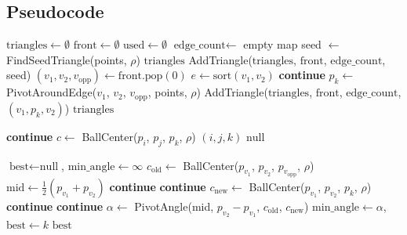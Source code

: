 \subsection{Pseudocode}
\begin{algorithm}
\caption{Ball Pivoting Algorithm Reconstruction}
\label{alg:ball_pivoting}
\begin{algorithmic}[1]
    \State $\text{triangles} \gets \emptyset$
    \State $\text{front} \gets \emptyset$ 
    \State $\text{used} \gets \emptyset$
    \State $\text{edge\_count} \gets$ empty map 
    \State seed $\gets$ FindSeedTriangle(points, $\rho$)
        \State \Return $\text{triangles}$
    \EndIf
    \State AddTriangle($\text{triangles}$, $\text{front}$, $\text{edge\_count}$, seed)
        \State $(v_1, v_2, v_\text{opp}) \gets \text{front}.\text{pop}(0)$
        \State $e \gets \text{sort}(v_1, v_2)$
            \State \textbf{continue} 
        \EndIf
        \State $p_k \gets$ PivotAroundEdge($v_1$, $v_2$, $v_\text{opp}$, points, $\rho$)
            \State AddTriangle($\text{triangles}$, $\text{front}$, $\text{edge\_count}$, $(v_1, p_k, v_2)$)
        \EndIf
    \EndWhile
    \State \Return $\text{triangles}$
\EndFunction

             \textbf{continue}
            \EndIf
                \State $c \gets$ BallCenter($p_i$, $p_j$, $p_k$, $\rho$)
                    \State \Return $(i, j, k)$
                \EndIf
            \EndFor
        \EndFor
    \EndFor
    \State \Return $\text{null}$
\EndFunction

    \State $\text{best} \gets \text{null}$, $\text{min\_angle} \gets \infty$
    \State $c_\text{old} \gets$ BallCenter($p_{v_1}$, $p_{v_2}$, $p_{v_\text{opp}}$, $\rho$)
    \State $\text{mid} \gets \frac{1}{2}(p_{v_1} + p_{v_2})$
         \textbf{continue}
        \EndIf
         \textbf{continue}
        \EndIf
        \State $c_\text{new} \gets$ BallCenter($p_{v_1}$, $p_{v_2}$, $p_k$, $\rho$)
         \textbf{continue}
        \EndIf
            \textbf{continue}
        \EndIf
        \State $\alpha \gets$ PivotAngle(mid, $p_{v_2} - p_{v_1}$, $c_\text{old}$, $c_\text{new}$)
            \State $\text{min\_angle} \gets \alpha$, $\text{best} \gets k$
        \EndIf
    \EndFor
    \State \Return $\text{best}$
\EndFunction


\end{algorithmic}
\end{algorithm}
